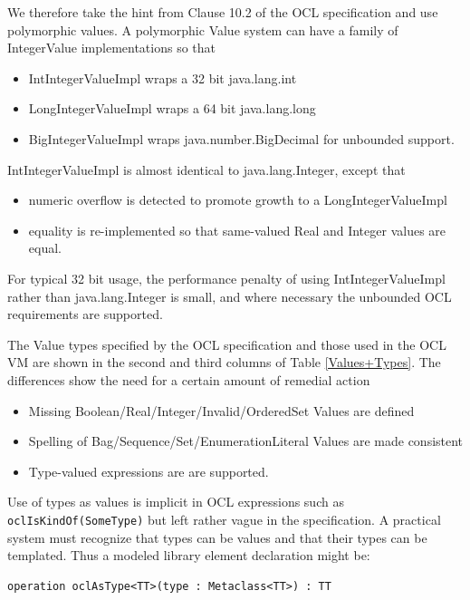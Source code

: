 \documentclass{sig-alternate}
\begin{document}
We therefore take the hint from Clause 10.2 of the OCL specification and use polymorphic values.
A polymorphic Value system can have a family of IntegerValue implementations so that
 \begin{itemize}
\item IntIntegerValueImpl wraps a 32 bit java.lang.int
\item LongIntegerValueImpl wraps a 64 bit java.lang.long 
\item BigIntegerValueImpl wraps java.number.BigDecimal for unbounded support.
\end{itemize}
IntIntegerValueImpl is almost identical to java.lang.Integer, except that 
\begin{itemize}
\item numeric overflow is detected to promote growth to a LongIntegerValueImpl
\item equality is re-implemented so that same-valued Real and Integer values are equal.
\end{itemize}
For typical 32 bit usage, the performance penalty of using IntIntegerValueImpl rather than java.lang.Integer is small, and where necessary the unbounded OCL requirements are supported.

The Value types specified by the OCL specification and those used in the OCL VM are shown in the second and third columns of Table \ref{Values+Types}. The differences show the need for a certain amount of remedial action
\begin{itemize}
\item Missing Boolean/Real/Integer/Invalid/OrderedSet Values are defined
\item Spelling of Bag/Sequence/Set/EnumerationLiteral Values are made consistent 
\item Type-valued expressions are are supported.
\end{itemize}

Use of types as values is implicit in OCL expressions such as \verb|oclIsKindOf(SomeType)| but left rather vague in the specification. A practical system must recognize that types can be values and that their types can be templated. Thus a modeled
library element declaration\cite{OCL-stdlib} might be:
\begin{verbatim}
operation oclAsType<TT>(type : Metaclass<TT>) : TT
\end{verbatim}
\end{document}
